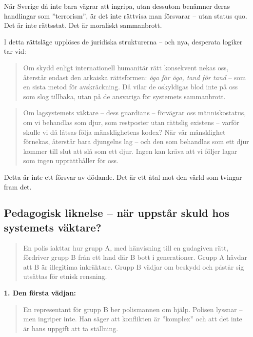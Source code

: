 När Sverige då inte bara vägrar att ingripa, utan dessutom benämner deras handlingar som ”terrorism”, är det inte rättvisa man försvarar – utan status quo. Det är inte rättsstat. Det är moraliskt sammanbrott.

I detta rättsläge upplöses de juridiska strukturerna – och nya, desperata logiker tar vid:

\begin{quote}
Om skydd enligt internationell humanitär rätt konsekvent nekas oss, återstår endast den arkaiska rättsformen: \textit{öga för öga, tand för tand} – som en sista metod för avskräckning. Då vilar de oskyldigas blod inte på oss som slog tillbaka, utan på de ansvariga för systemets sammanbrott.
\end{quote}

\begin{quote}
Om lagsystemets väktare – dess guardians – förvägrar oss människostatus, om vi behandlas som djur, som restposter utan rättslig existens – varför skulle vi då låtsas följa mänsklighetens kodex? När vår mänsklighet förnekas, återstår bara djungelns lag – och den som behandlas som ett djur kommer till slut att slå som ett djur. Ingen kan kräva att vi följer lagar som ingen upprätthåller för oss.
\end{quote}

Detta är inte ett försvar av dödande. Det är ett åtal mot den värld som tvingar fram det.




\subsection*{Pedagogisk liknelse – när uppstår skuld hos systemets väktare?}

\begin{quote}
En polis iakttar hur grupp A, med hänvisning till en gudagiven rätt, fördriver grupp B från ett land där B bott i generationer. Grupp A hävdar att B är illegitima inkräktare. Grupp B vädjar om beskydd och påstår sig utsättas för etnisk rensning.
\end{quote}

\textbf{1. Den första vädjan:}
\begin{quote}
En representant för grupp B ber polismannen om hjälp. Polisen lyssnar – men ingriper inte. Han säger att konflikten är ”komplex” och att det inte är hans uppgift att ta ställning.
\end{quote}

